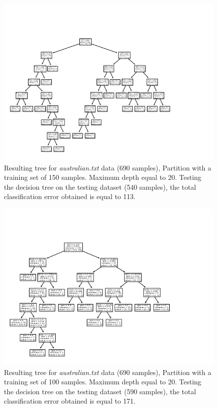 \documentclass[12pt,letterpaper]{article}
\begin{document}
\begin{figure}[H]
    \centering
    \includegraphics[width=15cm]{images/tree150_113over540.jpg}
    \caption{Resulting tree for \textit{australian.txt} data (690 samples), Partition with a training set of 150 samples. Maximum depth equal to 20. Testing the decision tree on  the testing dataset (540 samples), the total classification error obtained is equal to 113.}
    \label{fig:2}
\end{figure}
\begin{figure}[H]
    \centering
    \includegraphics[width=15cm]{images/tree100_171over590.jpg}
    \caption{Resulting tree for \textit{australian.txt} data (690 samples), Partition with a training set of 100 samples. Maximum depth equal to 20. Testing the decision tree on  the testing dataset (590 samples), the total classification error obtained is equal to 171.}
    \label{fig:3}
\end{figure}
\end{document}
